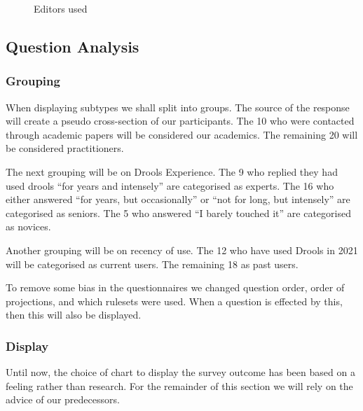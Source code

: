 \begin{figure}[h]
    \centering
    \caption{Editors used}
    \label{fig:editorUsage}
\end{figure}


\subsection{Question Analysis}

\subsubsection{Grouping}
When displaying subtypes we shall split into groups.
The source of the response will create a pseudo cross-section of our participants.
The 10 who were contacted through academic papers will be considered our academics.
The remaining 20 will be considered practitioners.

The next grouping will be on Drools Experience.
The 9 who replied they had used drools ``for years and intensely'' are categorised as experts.
The 16 who either answered ``for years, but occasionally'' or ``not for long, but intensely'' are categorised as seniors.
The 5 who answered ``I barely touched it'' are categorised as novices.

Another grouping will be on recency of use.
The 12 who have used Drools in 2021 will be categorised as current users.
The remaining 18 as past users.

To remove some bias in the questionnaires we changed question order, order of projections, and which rulesets were used.
When a question is effected by this, then this will also be displayed.

\subsubsection{Display}
Until now, the choice of chart to display the survey outcome has been based on a feeling rather than research. 
For the remainder of this section we will rely on the advice of our predecessors.

